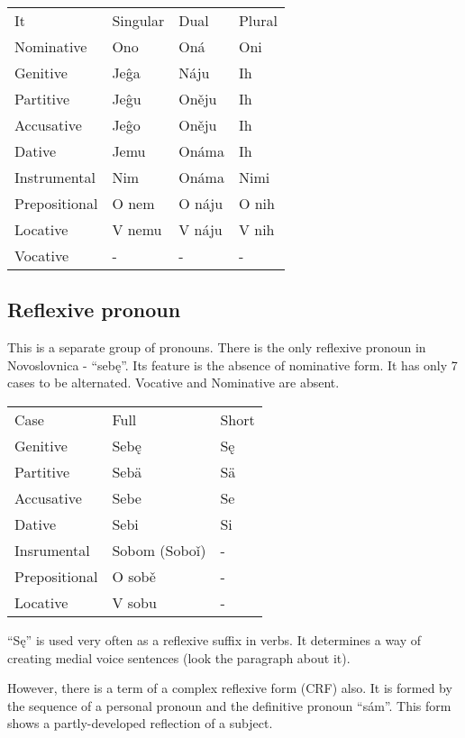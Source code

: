 \begin{table}[!htb]
	\begin{tabular}{llll}
		It & Singular & Dual & Plural \\
		Nominative & Ono & Oná & Oni \\
		Genitive & Jeĝa & Náju & Ih \\
		Partitive & Jeĝu & Oněju & Ih \\
		Accusative & Jeĝo & Oněju & Ih \\
		Dative & Jemu & Onáma & Ih \\
		Instrumental & Nim & Onáma & Nimi \\
		Prepositional & O nem & O náju & O nih \\
		Locative & V nemu & V náju & V nih \\
		Vocative & - & - & -
	\end{tabular}
\end{table}


\subsection{Reflexive pronoun}

This is a separate group of pronouns. There is the only reflexive pronoun in Novoslovnica - “sebę”. Its feature is the absence of nominative form. It has only 7 cases to be alternated. Vocative and Nominative are absent.

\begin{table}
	\begin{tabular}{lll}
		Case & Full & Short \\
		Genitive & Sebę & Sę \\
		Partitive & Sebä & Sä \\
		Accusative & Sebe & Se \\
		Dative & Sebi & Si \\ 
		Insrumental & Sobom (Soboǐ) & - \\ 
		Prepositional & O sobě & - \\
		Locative & V sobu & -
	\end{tabular}
\end{table}


“Sę” is used very often as a reflexive suffix in verbs. It determines a way of creating medial voice sentences (look the paragraph about it).

However, there is a term of a complex reflexive form (CRF) also. It is formed by the sequence of a personal pronoun and the definitive pronoun “sám”. This form shows a partly-developed reflection of a subject.  

